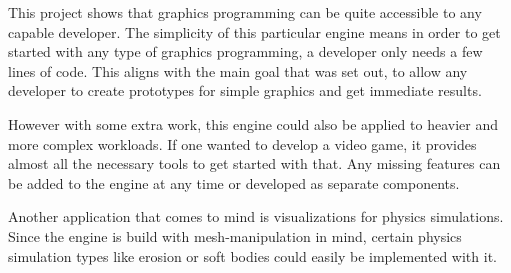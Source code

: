 
This project shows that graphics programming can be quite accessible to any capable developer.
The simplicity of this particular engine means in order to get started with any type of graphics programming,
a developer only needs a few lines of code.
This aligns with the main goal that was set out,
to allow any developer to create prototypes for simple graphics and get immediate results.

However with some extra work,
this engine could also be applied to heavier and more complex workloads.
If one wanted to develop a video game,
it provides almost all the necessary tools to get started with that.
Any missing features can be added to the engine at any time or developed as separate components.

Another application that comes to mind is visualizations for physics simulations.
Since the engine is build with mesh-manipulation in mind,
certain physics simulation types like erosion or soft bodies could easily be implemented with it.
